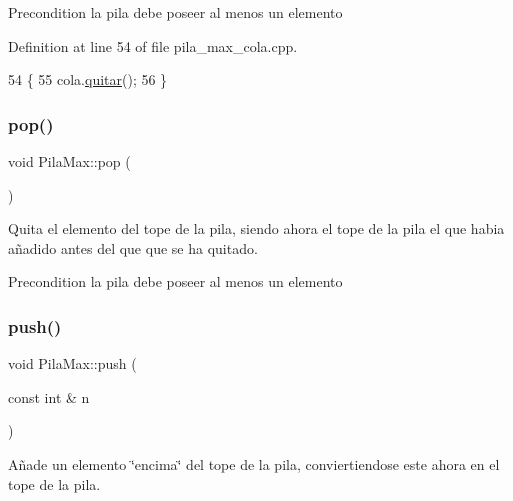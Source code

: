\begin{DoxyPrecond}{Precondition}
la pila debe poseer al menos un elemento 
\end{DoxyPrecond}


Definition at line 54 of file pila\+\_\+max\+\_\+cola.\+cpp.


\begin{DoxyCode}
54                  \{
55   cola.\hyperlink{classCola_a320766ddc7020424052c99e5c82a105d}{quitar}();
56 \}
\end{DoxyCode}
\mbox{\label{classPilaMax_ac728a5593dbd9acb5d400f416e680736}} 
\subsubsection{\texorpdfstring{pop()}{pop()}\hspace{0.1cm}{\footnotesize\ttfamily [2/2]}}
{\footnotesize\ttfamily void Pila\+Max\+::pop (\begin{DoxyParamCaption}{ }\end{DoxyParamCaption})}



Quita el elemento del tope de la pila, siendo ahora el tope de la pila el que habia añadido antes del que que se ha quitado. 

\begin{DoxyPrecond}{Precondition}
la pila debe poseer al menos un elemento 
\end{DoxyPrecond}
\mbox{\label{classPilaMax_a68d85126d08a5a73bce655390e5bf2d7}} 
\subsubsection{\texorpdfstring{push()}{push()}\hspace{0.1cm}{\footnotesize\ttfamily [1/2]}}
{\footnotesize\ttfamily void Pila\+Max\+::push (\begin{DoxyParamCaption}\item[{const int \&}]{n }\end{DoxyParamCaption})}



Añade un elemento \char`\"{}encima\char`\"{} del tope de la pila, conviertiendose este ahora en el tope de la pila. 


